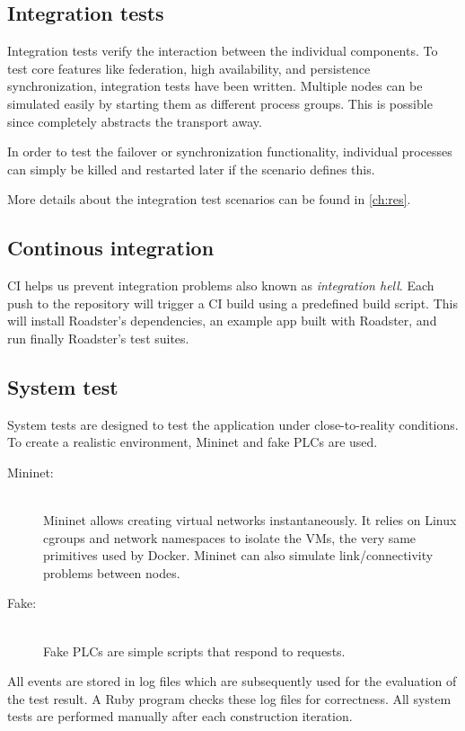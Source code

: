 \subsection{Integration tests}
Integration tests verify the interaction between the individual components.
To test core features like federation, high availability, and persistence
synchronization, integration tests have been written. Multiple nodes can be
simulated easily by starting them as different process groups. This is possible
since \zmq completely abstracts the transport away.

In order to test the failover or synchronization functionality, individual processes
can simply be killed and restarted later if the scenario defines this.

More details about the integration test scenarios can be found in \autoref{ch:res}.

\subsection{Continous integration}
\gls{CI} helps us prevent integration problems also known as \emph{integration
hell}. Each push to the repository will trigger a CI build using a predefined
build script. This will install Roadster's dependencies, an example app built
with Roadster, and run finally Roadster's test suites.

\subsection{System test}
System tests are designed to test the application under close-to-reality conditions.
To create a realistic environment, Mininet and fake \glspl{PLC} are used.
\begin{description}
	\item [Mininet:]\hfill\\
		Mininet allows creating virtual networks instantaneously. It
		relies on Linux cgroups and network namespaces to isolate the
		\glspl{VM}, the very same primitives used by Docker.
		Mininet can also simulate link/connectivity problems between nodes.
	\item [Fake:]\hfill\\
		Fake \glspl{PLC} are simple scripts that respond to requests.
\end{description}

All events are stored in log files which are subsequently used for the
evaluation of the test result.  A Ruby program checks these log files for
correctness. All system tests are performed manually after each construction
iteration.

